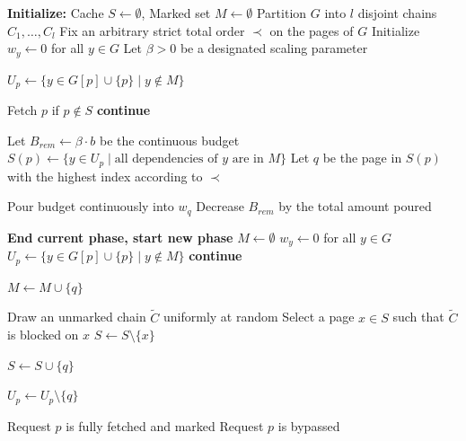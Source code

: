 \documentclass[a4paper]{article}
\begin{document}
\begin{algorithm}
\caption{Randomized Budget-Pouring for Paging with Rejections}
\label{alg:bypass_pouring}
\begin{algorithmic}[1]
\State \textbf{Initialize:} Cache $S \gets \emptyset$, Marked set $M \gets \emptyset$
\State Partition $G$ into $l$ disjoint chains $C_1, \ldots, C_l$ 
\State Fix an arbitrary strict total order $\prec$ on the pages of $G$
\State Initialize $w_y \gets 0$ for all $y \in G$
\State Let $\beta > 0$ be a designated scaling parameter

    \State $U_p \gets \{y \in G[p] \cup \{p\} \mid y \notin M\}$ 
    
        \State Fetch $p$ if $p \notin S$
        \State \textbf{continue} 
    \EndIf
    
    \State Let $B_{rem} \gets \beta \cdot b$ be the continuous budget
        \State $S(p) \gets \{y \in U_p \mid \text{all dependencies of } y \text{ are in } M\}$
        \State Let $q$ be the page in $S(p)$ with the highest index according to $\prec$
        
        \State Pour budget continuously into $w_q$
        \State Decrease $B_{rem}$ by the total amount poured
        
             
                \State \textbf{End current phase, start new phase}
                \State $M \gets \emptyset$ 
                \State $w_y \gets 0$ for all $y \in G$ 
                \State $U_p \gets \{y \in G[p] \cup \{p\} \mid y \notin M\}$ 
                \State \textbf{continue} 
            \EndIf
            
            \State $M \gets M \cup \{q\}$ 
            
             
                \State Draw an unmarked chain $\tilde{C}$ uniformly at random
                \State Select a page $x \in S$ such that $\tilde{C}$ is blocked on $x$ 
                \State $S \gets S \setminus \{x\}$ 
            \EndIf
            
                \State $S \gets S \cup \{q\}$ 
            \EndIf
            
            \State $U_p \gets U_p \setminus \{q\}$ 
        \EndIf
    \EndWhile
    
        \State Request $p$ is fully fetched and marked
    \Else
        \State Request $p$ is bypassed
    \EndIf
\EndFor
\end{algorithmic}
\end{algorithm}
\end{document}
